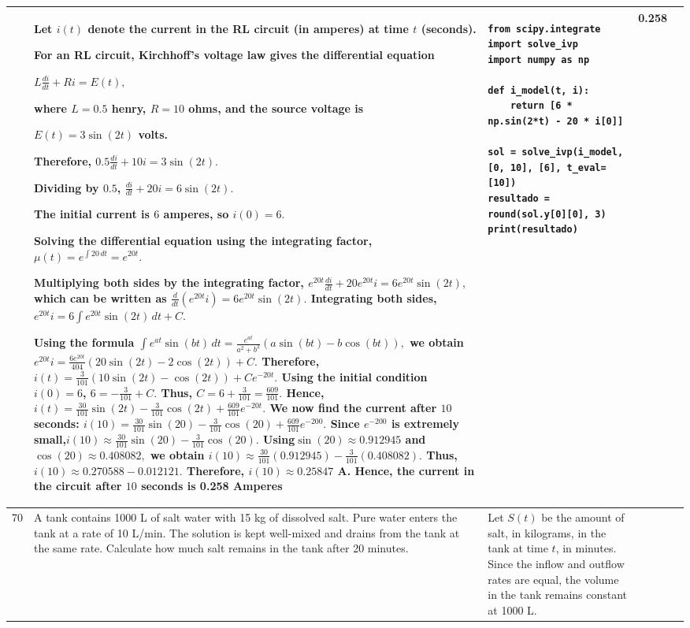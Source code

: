 \documentclass[a4paper,12pt]{article}
\begin{document}
\begin{longtable}{|p{0.3cm}|p{}|p{10cm}|p{}|p{1.5cm}|}
              &Let $i(t)$ denote the current in the RL circuit (in amperes) at time $t$ (seconds).

For an RL circuit, Kirchhoff's voltage law gives the differential equation

$L\frac{di}{dt}+Ri=E(t),$

where $L=0.5$ henry, $R=10$ ohms, and the source voltage is

$E(t)=3\sin(2t)$ volts.

Therefore, $0.5\frac{di}{dt}+10i=3\sin(2t).$

Dividing by $0.5$, $\frac{di}{dt}+20i=6\sin(2t).$

The initial current is $6$ amperes, so $i(0)=6.$

Solving the differential equation using the integrating factor,
$\mu(t)=e^{\int20\,dt}=e^{20t}.$

Multiplying both sides by the integrating factor,
$e^{20t}\frac{di}{dt}+20e^{20t}i
=6e^{20t}\sin(2t),$
which can be written as $\frac{d}{dt}\left(e^{20t}i\right)
=6e^{20t}\sin(2t).$ Integrating both sides,
$e^{20t}i=6\int e^{20t}\sin(2t)\,dt+C.$

Using the formula $\int e^{at}\sin(bt)\,dt
=\frac{e^{at}}{a^2+b^2}
\left(a\sin(bt)-b\cos(bt)\right),$ we obtain
$e^{20t}i=\frac{6e^{20t}}{404}
\left(20\sin(2t)-2\cos(2t)\right)+C.$
Therefore, $i(t)=\frac{3}{101}\left(10\sin(2t)-\cos(2t)\right)+Ce^{-20t}.$
Using the initial condition $i(0)=6$, $6=-\frac{3}{101}+C.$
Thus, $C=6+\frac{3}{101}=\frac{609}{101}.$
Hence, $i(t)=\frac{30}{101}\sin(2t)-\frac{3}{101}\cos(2t)
+\frac{609}{101}e^{-20t}.$
We now find the current after $10$ seconds:
$i(10)=\frac{30}{101}\sin(20)
-\frac{3}{101}\cos(20)
+\frac{609}{101}e^{-200}.$
Since $e^{-200}$ is extremely small,$i(10)\approx\frac{30}{101}\sin(20)
-\frac{3}{101}\cos(20).$
Using$\sin(20)\approx0.912945$ and $\cos(20)\approx0.408082,$
we obtain $i(10)\approx\frac{30}{101}(0.912945)
-\frac{3}{101}(0.408082).$ Thus, $i(10)\approx0.270588-0.012121.$
Therefore, $i(10)\approx0.25847$ A.
Hence, the current in the circuit after $10$ seconds is 0.258 Amperes


&\begin{verbatim}
from scipy.integrate import solve_ivp
import numpy as np

def i_model(t, i):
    return [6 * np.sin(2*t) - 20 * i[0]]

sol = solve_ivp(i_model, [0, 10], [6], t_eval=[10])
resultado = round(sol.y[0][0], 3)
print(resultado)
\end{verbatim} & 0.258 \\ \hline 
70  &A tank contains 1000 L of salt water with 15 kg of dissolved salt. Pure water enters the tank at a rate of 10 L/min. The solution is kept well-mixed and drains from the tank at the same rate. Calculate how much salt remains in the tank after 20 minutes. &
Let $S(t)$ be the amount of salt, in kilograms, in the tank at time $t$, in minutes. Since the inflow and outflow rates are equal, the volume in the tank remains constant at 1000 L.


\end{longtable}
\end{document}
